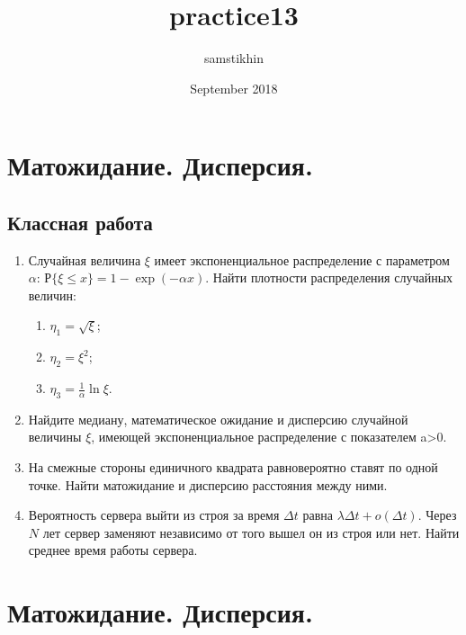 \documentclass[a4paper, 14pt]{extarticle}
\title{practice13}
\author{samstikhin}
\date{September 2018}
\begin{document}
	
	\section*{Матожидание. Дисперсия.}
	\subsection*{Классная работа}
	\begin{enumerate}
		\item Случайная величина $\xi$ имеет экспоненциальное
		распределение с параметром $\alpha$: $Р\{\xi\leq x\} =1- \exp(-\alpha x)$.
		Найти плотности распределения случайных величин:
		\begin{enumerate}
			\item 
			$ \eta_1=\sqrt{\xi}$;
			\item $\eta_2=\xi^2$; 
			\item 	$\eta_3=\frac{1}{\alpha}\ln \xi$.
		\end{enumerate}
		\item Найдите медиану, математическое ожидание и дисперсию случайной величины $\xi$, имеющей экспоненциальное распределение с показателем a>0. 
		\item На смежные стороны единичного квадрата равновероятно ставят по одной точке. Найти матожидание и дисперсию расстояния между ними.  
		\item Вероятность сервера выйти из строя за время $\Delta t$ равна $\lambda\Delta t+o(\Delta t)$. Через $N$ лет сервер заменяют независимо от того вышел он из строя или нет. Найти среднее время работы сервера.   
	\end{enumerate}
	
	\newpage
	
	\section*{Матожидание. Дисперсия.}
\end{document}
